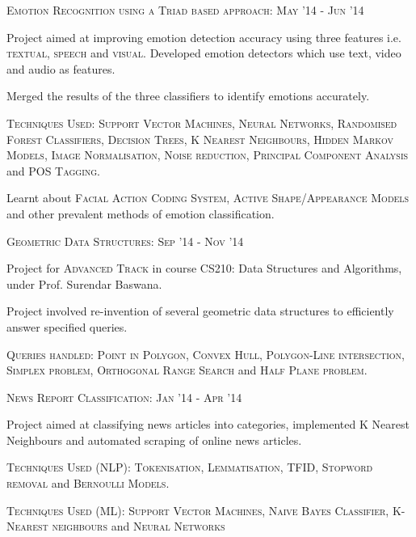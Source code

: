 \documentclass[10pt]{article}
\begin{document}
	
	\large{\textsc{Emotion Recognition using a Triad based approach:}}   \hfill \small\textsc{May '14 - Jun '14}
	\begin{itemize}
	\small
	{
	\item Project aimed at improving emotion detection accuracy using three features i.e. \textsc{textual, speech} and \textsc{visual}. Developed emotion detectors which use text, video and audio as features.
	\item Merged the results of the three classifiers to identify emotions accurately.
	\item \textsc{Techniques Used:} \textsc{Support Vector Machines, Neural Networks, Randomised Forest Classifiers, Decision Trees, K Nearest Neighbours, Hidden Markov Models, Image Normalisation, Noise reduction, Principal Component Analysis} and \textsc{POS Tagging}.
	\item Learnt about \textsc{Facial Action Coding System,
Active Shape/Appearance Models} and other prevalent methods of emotion classification.
	}
	\end{itemize}
		
	\vspace{1mm}
	
	\large{\textsc{Geometric Data Structures:}}   \hfill \small\textsc{Sep '14 - Nov '14}
	\begin{itemize}
	\small
	{
	\item Project for \textsc{Advanced Track} in course CS210: Data Structures and Algorithms, under Prof. Surendar Baswana.
	\item Project involved re-invention of several geometric data structures to efficiently answer specified queries.	
	\item \textsc{Queries handled:} \textsc{Point in Polygon, Convex Hull, Polygon-Line intersection, Simplex problem, Orthogonal Range Search} and \textsc{Half Plane problem}.
	}
	\end{itemize}
 		
	\vspace{1mm}
		
	\large{\textsc{News Report Classification:}}   \hfill \small\textsc{Jan '14 - Apr '14}
	\begin{itemize}
	\small
	{
	\item Project aimed at classifying news articles into categories, implemented K Nearest Neighbours and automated scraping of online news articles.
	\item \textsc{Techniques Used (NLP):} \textsc{Tokenisation, Lemmatisation, TFID, Stopword removal} and \textsc{Bernoulli Models}.
	\item \textsc{Techniques Used (ML):} \textsc{Support Vector Machines, Naive Bayes Classifier, K-Nearest neighbours} and \textsc{Neural Networks}
	}
	\end{itemize}
 		
\end{document}
